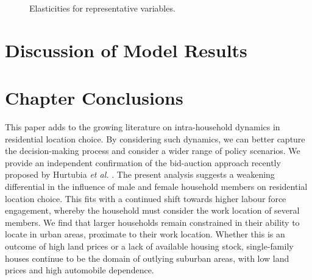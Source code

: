 \begin{figure}[H]
\centering
\caption{\label{fig:elasticity}Elasticities for representative variables.}
\end{figure}

\section{Discussion of Model Results}

\section{Chapter Conclusions}
This paper adds to the growing literature on intra-household dynamics in residential location choice. By considering such dynamics, we can better capture the decision-making process and consider a wider range of policy scenarios. We provide an independent confirmation of the bid-auction approach recently proposed by Hurtubia \emph{et al.} \cite{Hurtubia2017}. The present analysis suggests a weakening differential in the influence of male and female household members on residential location choice. This fits with a continued shift towards higher labour force engagement, whereby the household must consider the work location of several members. We find that larger households remain constrained in their ability to locate in urban areas, proximate to their work location. Whether this is an outcome of high land prices or a lack of available housing stock, single-family houses continue to be the domain of outlying suburban areas, with low land prices and high automobile dependence.

